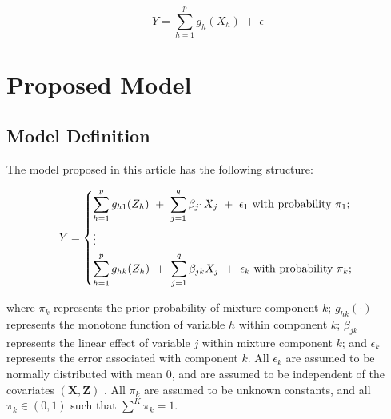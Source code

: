 \documentclass[10pt]{olplainarticle}\usepackage[]{graphicx}\usepackage[]{color}
\begin{document}
\begin{equation} \label{cpav}
  Y = \sum_{h=1}^{p} g_{h} (X_{h}) \ +\ \epsilon
\end{equation}


% 

\section{Proposed Model}


\subsection{Model Definition}

The model proposed in this article has the following structure:

\begin{equation} \label{modstruc}
  Y = 
  \begin{dcases}
    \sum_{h=1}^{p} g_{h1} (Z_{h}) \ +\  \sum_{j=1}^{q} \beta_{j1} X_{j} \ +\ \epsilon_1 \text{  with probability $\pi_1$; } \\
    \vdots \\
    \sum_{h=1}^{p} g_{hk} (Z_{h}) \ +\  \sum_{j=1}^{q} \beta_{jk} X_{j} \ +\ \epsilon_k \text{  with probability $\pi_k$; }\\
  \end{dcases}
\end{equation}

where $\pi_k$ represents the prior probability of mixture component $k$; $g_{hk}(\cdot)$ represents the monotone function of variable $h$ within component $k$; $\beta_{jk}$ represents the linear effect of variable $j$ within mixture component $k$; and $\epsilon_k$ represents the error associated with component $k$. All $\epsilon_k$ are assumed to be normally distributed with mean $0$, and are assumed to be independent of the covariates $(\boldsymbol{X}, \boldsymbol{Z})$ . All $\pi_k$ are assumed to be unknown constants, and all $\pi_k \in (0,1)$ such that $\sum^{K} \pi_k = 1$.
\end{document}
